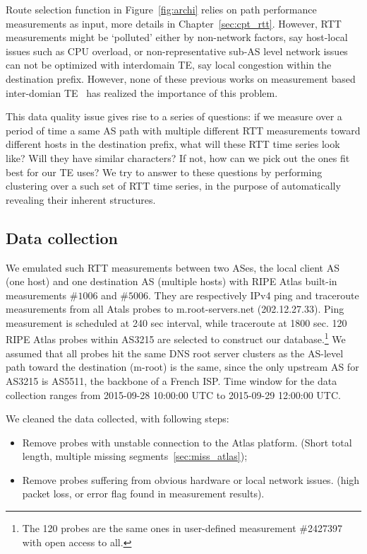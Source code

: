 Route selection function in Figure~\ref{fig:archi} relies on path performance measurements as input, more details in Chapter~\ref{sec:cpt_rtt}.
However, RTT measurements might be `polluted' either by non-network factors, say host-local issues such as CPU overload, or non-representative sub-AS level network issues can not be optimized with interdomain TE, say local congestion within the destination prefix.
However, none of these previous works on measurement based inter-domian TE~\cite{Goldenberg2004, Akella2008} has realized the importance of this problem.

This data quality issue gives rise to a series of questions: if we measure over a period of time a same AS path with multiple different RTT measurements toward different hosts in the destination prefix, what will these RTT time series look like? Will they have similar characters? If not, how can we pick out the ones fit best for our TE uses?
We try to answer to these questions by performing clustering over a such set of RTT time series, in the purpose of automatically revealing their inherent structures.

\subsection{Data collection}
We emulated such RTT measurements between two ASes, the local client AS (one host) and one destination AS (multiple hosts) with RIPE Atlas built-in measurements $\#1006$ and $\#5006$.
They are respectively IPv4 ping and traceroute measurements from all Atals probes to m.root-servers.net (202.12.27.33). 
Ping measurement is scheduled at 240 sec interval, while traceroute at 1800 sec.
120 RIPE Atlas probes within AS3215 are selected to construct our database.\footnote{The 120 probes are the same ones in user-defined measurement \#2427397 with open access to all.}
We assumed that all probes hit the same DNS root server clusters as the AS-level path toward the destination (m-root) is the same, since the only upstream AS for AS3215 is AS5511, the backbone of a French \ac{ISP}. Time window for the data collection ranges from 2015-09-28 10:00:00 UTC to 2015-09-29 12:00:00 UTC.

We cleaned the data collected, with following steps:
\begin{itemize}
\item Remove probes with unstable connection to the Atlas platform. (Short total length, multiple missing segments~\ref{sec:miss_atlas});
\item Remove probes suffering from obvious hardware or local network issues. (high packet loss, or error flag found in measurement results).
\end{itemize}

